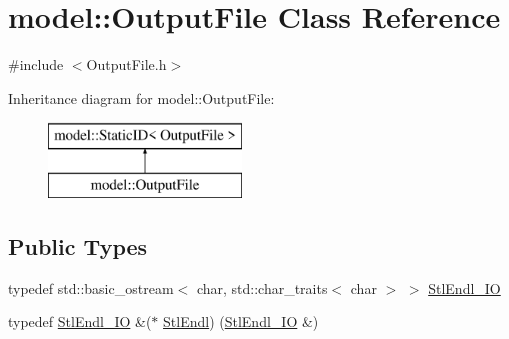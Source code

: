 \hypertarget{classmodel_1_1_output_file}{}\section{model\+:\+:Output\+File Class Reference}
\label{classmodel_1_1_output_file}


{\ttfamily \#include $<$Output\+File.\+h$>$}

Inheritance diagram for model\+:\+:Output\+File\+:\begin{figure}[H]
\begin{center}
\leavevmode
\includegraphics[height=2.000000cm]{classmodel_1_1_output_file}
\end{center}
\end{figure}
\subsection*{Public Types}
\begin{DoxyCompactItemize}
\item 
typedef std\+::basic\+\_\+ostream$<$ char, std\+::char\+\_\+traits$<$ char $>$ $>$ \hyperlink{classmodel_1_1_output_file_a4eec851075ba940612a2dc8e97043722}{Stl\+Endl\+\_\+\+I\+O}
\item 
typedef \hyperlink{classmodel_1_1_output_file_a4eec851075ba940612a2dc8e97043722}{Stl\+Endl\+\_\+\+I\+O} \&($\ast$ \hyperlink{classmodel_1_1_output_file_a14f6ff52d00061ec7a6bb597ff8c4e6e}{Stl\+Endl}) (\hyperlink{classmodel_1_1_output_file_a4eec851075ba940612a2dc8e97043722}{Stl\+Endl\+\_\+\+I\+O} \&)
\end{DoxyCompactItemize}
